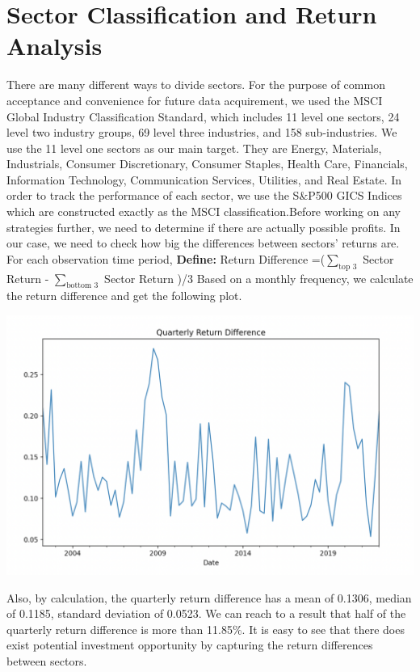 \documentclass{article}
\begin{document}
\section{Sector Classification and Return Analysis}
There are many different ways to divide sectors. For the purpose of common acceptance and convenience for future data acquirement, we used the MSCI Global Industry Classification Standard, which includes 11 level one sectors, 24 level two industry groups, 69 level three industries, and 158 sub-industries. We use the 11 level one sectors as our main target. They are Energy, Materials, Industrials, Consumer Discretionary, Consumer Staples, Health Care, Financials, Information Technology, Communication Services, Utilities, and Real Estate. In order to track the performance of each sector, we use the S$\&$P500 GICS Indices which are constructed exactly as the MSCI classification.Before working on any strategies further, we need to determine if there are actually possible profits. In our case, we need to check how big the differences between sectors' returns are. For each observation time period,
{\textbf{Define:}}  Return Difference =($ \sum_{\text{top 3}}$ Sector Return - $\sum_{\text{bottom 3}}$  Sector Return )/3
Based on a monthly frequency, we calculate the return difference and get the following plot.
\begin{center}
\includegraphics[scale=0.35]{return_difference.png}
\end{center}
Also, by calculation, the quarterly return difference has a mean of 0.1306, median of 0.1185, standard deviation of 0.0523. We can reach to a result that half of the quarterly return difference is more than 11.85$\%$. It is easy to see that there does exist potential investment opportunity by capturing the return differences between sectors. 
\end{document}
